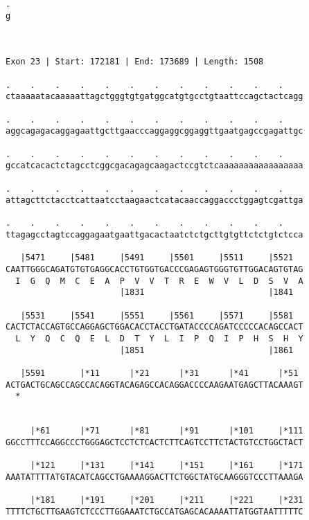 \documentclass{article}
\begin{document}
\begin{Verbatim}
.
g
 
 
 
Exon 23 | Start: 172181 | End: 173689 | Length: 1508
 
.    .    .    .    .    .    .    .    .    .    .    .    
ctaaaaatacaaaaattagctgggtgtgatggcatgtgcctgtaattccagctactcagg
                                                            
.    .    .    .    .    .    .    .    .    .    .    .    
aggcagagacaggagaattgcttgaacccaggaggcggaggttgaatgagccgagattgc
                                                            
.    .    .    .    .    .    .    .    .    .    .    .    
gccatcacactctagcctcggcgacagagcaagactccgtctcaaaaaaaaaaaaaaaaa
                                                            
.    .    .    .    .    .    .    .    .    .    .    .    
attagcttctacctcattaatcctaagaactcatacaaccaggaccctggagtcgattga
                                                            
.    .    .    .    .    .    .    .    .    .    .    .    
ttagagcctagtccaggagaatgaattgacactaatctctgcttgtgttctctgtctcca
                                                            
   |5471     |5481     |5491     |5501     |5511     |5521  
CAATTGGGCAGATGTGTGAGGCACCTGTGGTGACCCGAGAGTGGGTGTTGGACAGTGTAG
  I  G  Q  M  C  E  A  P  V  V  T  R  E  W  V  L  D  S  V  A
                       |1831                         |1841  
  
   |5531     |5541     |5551     |5561     |5571     |5581  
CACTCTACCAGTGCCAGGAGCTGGACACCTACCTGATACCCCAGATCCCCCACAGCCACT
  L  Y  Q  C  Q  E  L  D  T  Y  L  I  P  Q  I  P  H  S  H  Y
                       |1851                         |1861  
  
   |5591       |*11      |*21      |*31      |*41      |*51 
ACTGACTGCAGCCAGCCACAGGTACAGAGCCACAGGACCCCAAGAATGAGCTTACAAAGT
  *   
                                                            
  
     |*61      |*71      |*81      |*91      |*101     |*111
GGCCTTTCCAGGCCCTGGGAGCTCCTCTCACTCTTCAGTCCTTCTACTGTCCTGGCTACT
                                                            
     |*121     |*131     |*141     |*151     |*161     |*171
AAATATTTTATGTACATCAGCCTGAAAAGGACTTCTGGCTATGCAAGGGTCCCTTAAAGA
                                                            
     |*181     |*191     |*201     |*211     |*221     |*231
TTTTCTGCTTGAAGTCTCCCTTGGAAATCTGCCATGAGCACAAAATTATGGTAATTTTTC
                                                            

\end{Verbatim}
\end{document}
